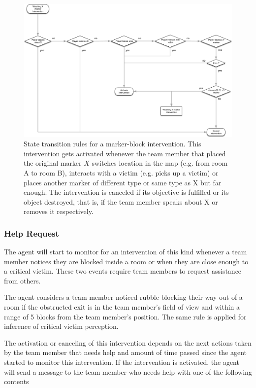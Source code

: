 \begin{figure}
    \centering
    \includegraphics[width=6.5in]{images/marker_block_intervention_flow_chart.pdf}
    \caption{State transition rules for a marker-block intervention. This intervention gets activated whenever the team member that placed the original marker $X$ switches location in the map (e.g. from room A to room B), interacts with a victim (e.g. picks up a victim) or places another marker of different type or same type as X but far enough. The intervention is canceled if its objective is fulfilled or its object destroyed, that is, if the team member speaks about X or removes it respectively.}
    \label{fig:marker_block_intervention_flow_chart}
\end{figure}



\subsubsection{Help Request}

The agent will start to monitor for an intervention of this kind whenever a team member notices they are blocked inside a room or when they are close enough to a critical victim. These two events require team members to request assistance from others.

The agent considers a team member noticed rubble blocking their way out of a room if the obstructed exit is in the team member's field of view and within a range of 5 blocks from the team member's position. The same rule is applied for inference of critical victim perception. 

The activation or canceling of this intervention depends on the next actions taken by the team member that needs help and amount of time passed since the agent started to monitor this intervention. If the intervention is activated, the agent will send a message to the team member who needs help with one of the following contents


